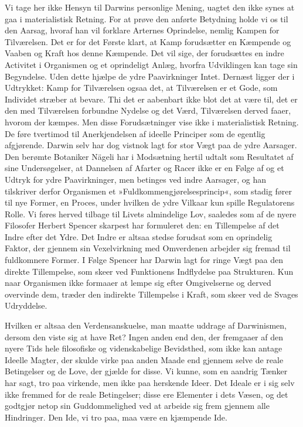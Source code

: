 \documentclass[12pt,a4paper]{article}
\begin{document}
Vi tage her ikke Hensyn til Darwins personlige Mening, uagtet den ikke
synes at gaa i materialistisk Retning. For at prøve den anførte Betydning
holde vi os til den Aarsag, hvoraf han vil forklare Arternes Oprindelse,
nemlig Kampen for Tilværelsen. Det er for det Første klart, at Kamp
forudsætter en Kæmpende og Vaaben og Kraft hos denne Kæmpende. Det vil
sige, der forudsættes en indre Activitet i Organismen og et oprindeligt
Anlæg, hvorfra Udviklingen kan tage sin Begyndelse. Uden dette hjælpe de
ydre Paavirkninger Intet. Dernæst ligger der i Udtrykket: Kamp for
Tilværelsen ogsaa det, at Tilværelsen er et Gode, som Individet stræber
at bevare. Thi det er aabenbart ikke blot det at være til, det er den med
Tilværelsen forbundne Nydelse og det Værd, Tilværelsen derved faaer,
hvorom der kæmpes. Men disse Forudsætninger vise ikke i materialistisk
Retning. De føre tvertimod til Anerkjendelsen af ideelle Principer som de
egentlig afgjørende. Darwin selv har dog vistnok lagt for stor Vægt paa
de ydre Aarsager. Den berømte Botaniker Nägeli har i Modsætning hertil
udtalt som Resultatet af sine Undersøgelser, at Dannelsen af Afarter og
Racer ikke er en Følge af og et Udtryk for ydre Paavirkninger, men
betinges ved indre Aarsager, og han tilskriver derfor Organismen et
»Fuldkommengjørelsesprincip«, som stadig fører til nye Former, en Proces,
under hvilken de ydre Vilkaar kun spille Regulatorens Rolle. Vi føres
herved tilbage til Livets almindelige Lov, saaledes som af de nyere
Filosofer Herbert Spencer skarpest har formuleret den: en Tillempelse af
det Indre efter det Ydre. Det Indre er altsaa stedse forudsat som en
oprindelig Faktor, der gjennem sin Vexelvirkning med Omverdenen arbejder
sig fremad til fuldkomnere Former. I Følge Spencer har Darwin lagt for
ringe Vægt paa den direkte Tillempelse, som skeer ved Funktionens
Indflydelse paa Strukturen. Kun naar Organismen ikke formaaer at lempe
sig efter Omgivelserne og derved overvinde dem, træder den indirekte
Tillempelse i Kraft, som skeer ved de Svages Udryddelse.

Hvilken er altsaa den Verdensanskuelse, man maatte uddrage af Darwinismen,
dersom den viste sig at have Ret? Ingen anden end den, der fremgaaer af
den nyere Tids hele filosofiske og videnskabelige Bevidsthed, som ikke
kan antage Ideelle Magter, der skulde virke paa anden Maade end gjennem
selve de reale Betingelser og de Love, der gjælde for disse. Vi kunne,
som en aandrig Tænker har sagt, tro paa virkende, men ikke paa herskende
Ideer. Det Ideale er i sig selv ikke fremmed for de reale Betingelser;
disse ere Elementer i dets Væsen, og det godtgjør netop sin Guddommelighed
ved at arbeide sig frem gjennem alle Hindringer. Den Ide, vi tro paa, maa
være en kjæmpende Ide.
\end{document}
